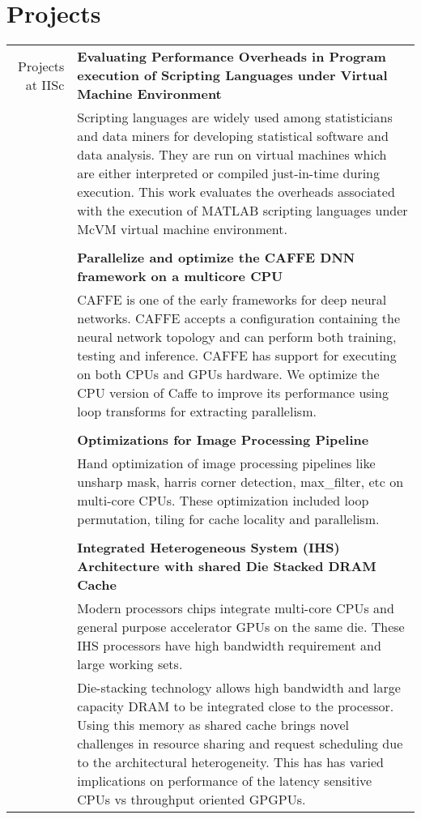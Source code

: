 \documentclass[a4paper,10pt]{article} %
\begin{document}
\section{Projects}
\begin{tabular}{rp{13cm}}
Projects at IISc& \textbf{Evaluating Performance Overheads in Program execution of Scripting Languages under Virtual Machine Environment} \\
& \setlength{\leftskip}{0.4cm}
Scripting languages are widely used among statisticians and data miners for developing statistical software and data analysis. They are run on virtual machines which are either interpreted or compiled just-in-time during execution. This work evaluates the overheads associated with the execution of MATLAB scripting languages under McVM virtual machine environment.\\
& \\
& \textbf{Parallelize and optimize the CAFFE DNN framework on a multicore CPU}\\
& \setlength{\leftskip}{0.4cm}
CAFFE is one of the early frameworks for deep neural networks. CAFFE accepts a configuration containing the neural network topology and can perform both training, testing and inference. CAFFE has support for executing  on both CPUs and GPUs hardware. We optimize the CPU version of Caffe to improve its performance using loop transforms for extracting parallelism.\\
& \\
& \textbf{Optimizations for Image Processing Pipeline} \\
& \setlength{\leftskip}{0.4cm}
Hand optimization of image processing pipelines like unsharp mask, harris corner detection, max\_filter, etc on multi-core CPUs. These optimization included loop permutation, tiling for cache locality and parallelism.\\
& \\
& \textbf{Integrated Heterogeneous System (IHS) Architecture with shared Die Stacked DRAM Cache} \\
& \setlength{\leftskip}{0.4cm}
Modern processors chips integrate multi-core CPUs and general purpose accelerator GPUs on the same die. These IHS processors have high bandwidth requirement and large working sets.\\
& \setlength{\leftskip}{0.4cm} 
Die-stacking technology allows high bandwidth and large capacity DRAM to be integrated close to the processor. Using this memory as shared cache brings novel challenges in resource sharing and request scheduling due to the architectural heterogeneity. This has has varied implications on performance of the latency sensitive CPUs vs throughput oriented GPGPUs.\\

\end{tabular}
\end{document}

